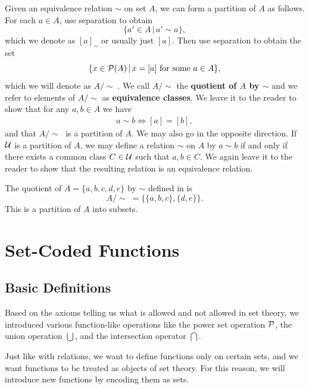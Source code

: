 Given an equivalence relation $\sim$ on set $A$, we can form a partition of $A$ as follows.
For each $a\in A$, use separation to obtain
\[ \{ a'\in A \,|\, a'\sim a \}, \]
which we denote as $[a]_{\sim}$ or usually just $[a]$.
Then use separation to obtain the set
\[ \{ x\in\mathcal{P}(A) \,|\, x = [a] \text{ for some } a\in A \}, \]
which we will denote as $A/\sim\;$. 
We call $A/\sim$ the \textbf{quotient of $A$ by $\sim$} and we refer to elements of $A/\sim$ as \textbf{equivalence classes}.
We leave it to the reader to show that for any $a, b\in A$ we have
\begin{align}\label{ch1eqn_equiv_classes_property}
	a\sim b \iff [a] = [b],
\end{align}
and that $A/\sim\;$ is a partition of $A$. 
We may also go in the opposite direction.
If $\mathcal{U}$ is a partition of $A$, we may define a relation $\sim$ on $A$ by $a\sim b$ if and only if there exists a common class $C\in\mathcal{U}$ such that $a, b\in C$. 
We again leave it to the reader to show that the resulting relation is an equivalence relation.

\begin{example}\label{ch1ex_rel_equivrel_partition}
	The quotient of $A = \{a, b, c, d, e\}$ by $\sim$ defined in  is
	\[ A/\sim\; = \{ \{a, b, c\}, \{d, e\} \}. \]
	This is a partition of $A$ into subsets. 
\end{example}

\section{Set-Coded Functions}\label{ch1sec_fns}

\subsection{Basic Definitions}

Based on the axioms telling us what is allowed and not allowed in set theory, we introduced various function-like operations like the power set operation $\mathcal{P}$, the union operation $\bigcup$, and the intersection operator $\bigcap$.

Just like with relations, we want to define functions only on certain sets, and we want functions to be treated as objects of set theory. 
For this reason, we will introduce new functions by encoding them as sets. 

